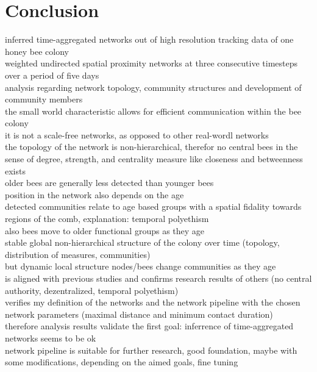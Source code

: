 \chapter{Conclusion}
\label{ch:conclusion}

inferred time-aggregated networks out of high resolution tracking data of one honey bee colony\\
weighted undirected spatial proximity networks at three consecutive timesteps over a period of five days\\
analysis regarding network topology, community structures and development of community members\\

the small world characteristic allows for efficient communication within the bee colony\\
it is not a scale-free networks, as opposed to other real-wordl networks\\
the topology of the network is non-hierarchical, therefor no central bees in the sense of degree, strength, and centrality measure like closeness and betweenness exists\\
older bees are generally less detected than younger bees\\
position in the network also depends on the age\\
detected communities relate to age based groups with a spatial fidality towards regions of the comb, explanation: temporal polyethism\\
also bees move to older functional groups as they age\\


stable global non-hierarchical structure of the colony over time (topology, distribution of measures, communities)\\
but dynamic local structure nodes/bees change communities as they age\\
is aligned with previous studies and confirms research results of others (no central authority, dezentralized, temporal polyethism)\\


verifies my definition of the networks and the network pipeline with the chosen network parameters (maximal distance and minimum contact duration)\\
therefore analysis results validate the first goal: inferrence of time-aggregated networks seems to be ok\\
network pipeline is suitable for further research, good foundation, maybe with some modifications, depending on the aimed goals, fine tuning\\


